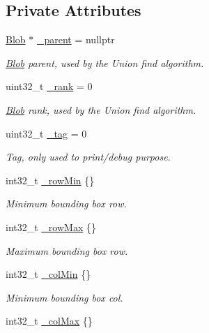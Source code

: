\subsection*{Private Attributes}
\begin{DoxyCompactItemize}
\item 
\hyperlink{classfc_1_1Blob}{Blob} $\ast$ \hyperlink{classfc_1_1Blob_ab58442d32a4ce2e9d5c4718d63e126d8}{\+\_\+parent} = nullptr
\begin{DoxyCompactList}\small\item\em \hyperlink{classfc_1_1Blob}{Blob} parent, used by the Union find algorithm. \end{DoxyCompactList}\item 
uint32\+\_\+t \hyperlink{classfc_1_1Blob_ad19347abbefa18b6e98e1156cf09fe3a}{\+\_\+rank} = 0
\begin{DoxyCompactList}\small\item\em \hyperlink{classfc_1_1Blob}{Blob} rank, used by the Union find algorithm. \end{DoxyCompactList}\item 
uint32\+\_\+t \hyperlink{classfc_1_1Blob_af07e1270217289a0879386f267bf5fe5}{\+\_\+tag} = 0
\begin{DoxyCompactList}\small\item\em Tag, only used to print/debug purpose. \end{DoxyCompactList}\item 
int32\+\_\+t \hyperlink{classfc_1_1Blob_ab63888a3d59cb3b81ad10e19864b101a}{\+\_\+row\+Min} \{\}
\begin{DoxyCompactList}\small\item\em Minimum bounding box row. \end{DoxyCompactList}\item 
int32\+\_\+t \hyperlink{classfc_1_1Blob_ada6057ee4bf33c0a432f28d5d42413dd}{\+\_\+row\+Max} \{\}
\begin{DoxyCompactList}\small\item\em Maximum bounding box row. \end{DoxyCompactList}\item 
int32\+\_\+t \hyperlink{classfc_1_1Blob_aa962a217328b361385584042e8d29eb9}{\+\_\+col\+Min} \{\}
\begin{DoxyCompactList}\small\item\em Minimum bounding box col. \end{DoxyCompactList}\item 
int32\+\_\+t \hyperlink{classfc_1_1Blob_ab35bcad8687bcbd04b0a7952702a88a6}{\+\_\+col\+Max} \{\}

\end{DoxyCompactItemize}

